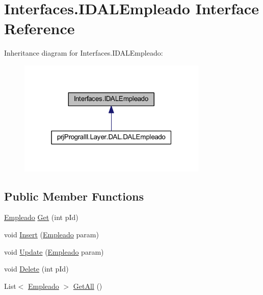 \hypertarget{interface_interfaces_1_1_i_d_a_l_empleado}{}\section{Interfaces.\+I\+D\+A\+L\+Empleado Interface Reference}
\label{interface_interfaces_1_1_i_d_a_l_empleado}


Inheritance diagram for Interfaces.\+I\+D\+A\+L\+Empleado\+:
\nopagebreak
\begin{figure}[H]
\begin{center}
\leavevmode
\includegraphics[width=256pt]{interface_interfaces_1_1_i_d_a_l_empleado__inherit__graph}
\end{center}
\end{figure}
\subsection*{Public Member Functions}
\begin{DoxyCompactItemize}
\item 
\hyperlink{classprj_progra_i_i_i_1_1_layer_1_1_entities_1_1_empleado}{Empleado} \hyperlink{interface_interfaces_1_1_i_d_a_l_empleado_a3a30db206c173af0ed7b44cf21e1de5c}{Get} (int p\+Id)
\item 
void \hyperlink{interface_interfaces_1_1_i_d_a_l_empleado_ad9609df99d0b1ad098a61ea27d700393}{Insert} (\hyperlink{classprj_progra_i_i_i_1_1_layer_1_1_entities_1_1_empleado}{Empleado} param)
\item 
void \hyperlink{interface_interfaces_1_1_i_d_a_l_empleado_a3e979162d517e91994750b5efc6451d9}{Update} (\hyperlink{classprj_progra_i_i_i_1_1_layer_1_1_entities_1_1_empleado}{Empleado} param)
\item 
void \hyperlink{interface_interfaces_1_1_i_d_a_l_empleado_a0e852e403321a652e418e8e09a94981d}{Delete} (int p\+Id)
\item 
List$<$ \hyperlink{classprj_progra_i_i_i_1_1_layer_1_1_entities_1_1_empleado}{Empleado} $>$ \hyperlink{interface_interfaces_1_1_i_d_a_l_empleado_a4e47f55e63675f0430e99e0873d269ff}{Get\+All} ()
\end{DoxyCompactItemize}


